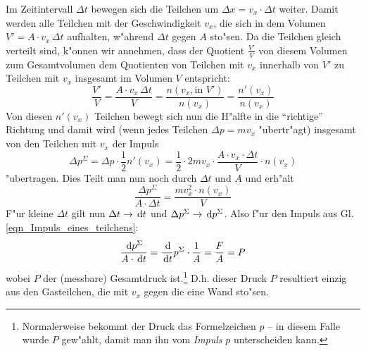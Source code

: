 
Im Zeitintervall $\Delta t$ bewegen sich die Teilchen um $\Delta x =
v_x \cdot \Delta t$ weiter. Damit werden alle Teilchen mit der
Geschwindigkeit $v_x$, die sich in dem Volumen $V' = A \cdot v_x \,
\Delta t$ aufhalten, w"ahrend $\Delta t$ gegen $A$ sto"sen. Da die
Teilchen gleich verteilt sind, k"onnen wir annehmen, dass der Quotient
$\frac{V'}{V}$ von diesem Volumen zum Gesamtvolumen dem Quotienten von
Teilchen mit $v_x$ innerhalb von $V'$ zu Teilchen mit $v_x$ insgesamt
im Volumen $V$ entspricht:
\begin{equation*}
  \frac{V'}{V} =  \frac{A \cdot v_x \, \Delta t}{V} = \frac{n(v_x,
    \text{in }V')}{n(v_x)} = \frac{n'(v_x)}{n(v_x)}
\end{equation*}
Von diesen $n'(v_x)$ Teilchen bewegt sich nun die H"alfte in die
"`richtige"' Richtung und damit wird (wenn jedes Teilchen $\Delta p =
mv_x$ "ubertr"agt) insgesamt von den Teilchen mit $v_x$ der Impuls
\begin{equation}
     \label{eqn_Impuls_eines_teilchens}
   \Delta  p^\Sigma = \Delta p \cdot \frac{1}{2}n'(v_x) = 
\frac{1}{2} \cdot 2m v_x \cdot \frac{A \cdot v_x \cdot \Delta t}{V}
\cdot n(v_x)
\end{equation}
"ubertragen. Dies Teilt man nun noch durch $\Delta t$ und $A$ und
erh"alt
\begin{equation}
   \label{eq:206}
   \frac{\Delta p^\Sigma}{A \cdot \Delta t} = \frac{mv_x^2 \cdot n(v_x)}{V}
\end{equation}
%
F"ur kleine $\Delta t$ gilt nun $\Delta t \to \, \mathrm{d} t$ und $\Delta p^\Sigma
\to \, \mathrm{d} p^\Sigma$. Also f"ur den Impuls aus Gl. \eqref{eqn_Impuls_eines_teilchens}:
$$
\frac{\diff p^\Sigma}{A \cdot \diff t} = 
\frac{\diff }{\diff t } p^\Sigma \cdot \frac{1}{A}
%
= \frac{F}{A} = P
$$
wobei $P$ der (messbare) Gesamtdruck ist.\footnote{Normalerweise
  bekommt der Druck das Formelzeichen $p$ -- in diesem Falle wurde $P$
gew"ahlt, damit man ihn vom \emph{Impuls} $p$ unterscheiden kann.} D.h. dieser
Druck $P$
resultiert einzig aus den Gasteilchen, die mit $v_x$ gegen die eine
Wand sto"sen.


